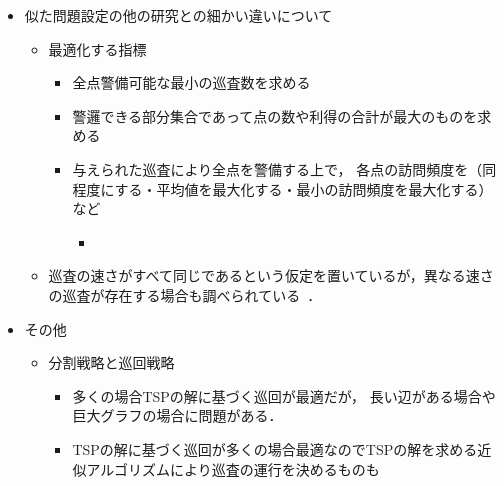 \begin{itemize}
  \item 似た問題設定の他の研究との細かい違いについて
  \begin{itemize}
    \item 最適化する指標
    \begin{itemize}
      \item 全点警備可能な最小の巡査数を求める
      \item 警邏できる部分集合であって点の数や利得の合計が最大のものを求める
      \item 与えられた巡査により全点を警備する上で，
      各点の訪問頻度を（同程度にする・平均値を最大化する・最小の訪問頻度を最大化する）など
      \begin{itemize}
        \item 
      \end{itemize}
    \end{itemize}
    \item 巡査の速さがすべて同じであるという仮定を置いているが，異なる速さの巡査が存在する場合も調べられている~\cite{}．
  \end{itemize}

  \item その他
  \begin{itemize}
    \item 分割戦略と巡回戦略
    \begin{itemize}
      \item 多くの場合TSPの解に基づく巡回が最適だが，
      長い辺がある場合や巨大グラフの場合に問題がある．
      \item TSPの解に基づく巡回が多くの場合最適なのでTSPの解を求める近似アルゴリズムにより巡査の運行を決めるものも
    \end{itemize} 
  \end{itemize}
\end{itemize}



